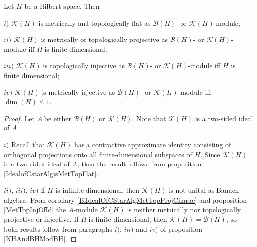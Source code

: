 \begin{proposition}\label{KHAndBHModKH} Let $H$ be a Hilbert space. Then 

$i)$ $\mathcal{K}(H)$ is metrically and topologically flat as $\mathcal{B}(H)$- or $\mathcal{K}(H)$-module;

$ii)$ $\mathcal{K}(H)$ is metrically or topologically projective as $\mathcal{B}(H)$- or $\mathcal{K}(H)$-module iff $H$ is finite dimensional;

$iii)$ $\mathcal{K}(H)$ is topologically injective as $\mathcal{B}(H)$- or $\mathcal{K}(H)$-module iff $H$ is finite dimensional;

$iv)$ $\mathcal{K}(H)$ is metrically injective as $\mathcal{B}(H)$- or $\mathcal{K}(H)$-module iff $\dim(H)\leq 1$.
\end{proposition}
\begin{proof} Let $A$ be either $\mathcal{B}(H)$ or $\mathcal{K}(H)$. Note that $\mathcal{K}(H)$ is a two-sided ideal of $A$. 

$i)$ Recall that $\mathcal{K}(H)$ has a contractive approximate identity consisting of orthogonal projections onto all finite-dimensional subspaces of $H$. Since $\mathcal{K}(H)$ is a two-sided ideal of $A$, then the result follows from proposition \ref{IdealofCstarAlgisMetTopFlat}.

$ii)$, $iii)$, $iv)$ If $H$ is infinite dimensional, then $\mathcal{K}(H)$ is not unital as Banach algebra. From corollary \ref{BiIdealOfCStarAlgMetTopProjCharac} and proposition \ref{MetTopInjOfId} the $A$-module $\mathcal{K}(H)$ is neither metrically nor topologically projective or injective. If $H$ is finite dimensional, then $\mathcal{K}(H)=\mathcal{B}(H)$, so both results follow from paragraphs $i)$, $iii)$ and $iv)$ of proposition \ref{KHAndBHModBH}.
\end{proof}

